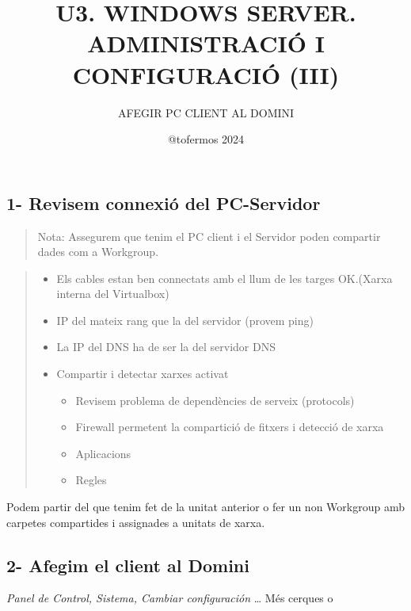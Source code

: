 \documentclass[
  a4paper,
]{article}
\title{U3. WINDOWS SERVER. ADMINISTRACIÓ I CONFIGURACIÓ (III)}
\subtitle{AFEGIR PC CLIENT AL DOMINI}
\author{@tofermos 2024}
\date{}
\begin{document}
\maketitle

{
\setcounter{tocdepth}{2}
\tableofcontents
}
\newpage
\renewcommand\tablename{Tabla}

\subsection{1- Revisem connexió del
PC-Servidor}\label{revisem-connexiuxf3-del-pc-servidor}

\begin{quote}
Nota: Assegurem que tenim el PC client i el Servidor poden compartir
dades com a Workgroup.
\end{quote}

\begin{quote}
\begin{itemize}
\item
  Els cables estan ben connectats amb el llum de les targes OK.(Xarxa
  interna del Virtualbox)
\item
  IP del mateix rang que la del servidor (provem ping)
\item
  La IP del DNS ha de ser la del servidor DNS
\item
  Compartir i detectar xarxes activat

  \begin{itemize}
  \item
    Revisem problema de dependències de serveix (protocols)
  \item
    Firewall permetent la compartició de fitxers i detecció de xarxa
  \item
    Aplicacions
  \item
    Regles
  \end{itemize}
\end{itemize}
\end{quote}

Podem partir del que tenim fet de la unitat anterior o fer un non
Workgroup amb carpetes compartides i assignades a unitats de xarxa.

\subsection{2- Afegim el client al
Domini}\label{afegim-el-client-al-domini}

\emph{Panel de Control, Sistema, Cambiar configuración} \ldots{} Més
cerques o
\end{document}
